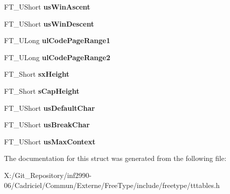 \begin{DoxyCompactItemize}
\item 
\hypertarget{struct_t_t___o_s2___aeb85b76e77753e4b59945550bdd098a1}{F\-T\-\_\-\-U\-Short {\bfseries us\-Win\-Ascent}}\label{struct_t_t___o_s2___aeb85b76e77753e4b59945550bdd098a1}

\item 
\hypertarget{struct_t_t___o_s2___a573ace3da03efa98a716a8443e4d0084}{F\-T\-\_\-\-U\-Short {\bfseries us\-Win\-Descent}}\label{struct_t_t___o_s2___a573ace3da03efa98a716a8443e4d0084}

\item 
\hypertarget{struct_t_t___o_s2___a0b5a2875c21d20e5a5b5f3641ddb29fc}{F\-T\-\_\-\-U\-Long {\bfseries ul\-Code\-Page\-Range1}}\label{struct_t_t___o_s2___a0b5a2875c21d20e5a5b5f3641ddb29fc}

\item 
\hypertarget{struct_t_t___o_s2___ad117c64d73d15d1304c75fb5f41f1124}{F\-T\-\_\-\-U\-Long {\bfseries ul\-Code\-Page\-Range2}}\label{struct_t_t___o_s2___ad117c64d73d15d1304c75fb5f41f1124}

\item 
\hypertarget{struct_t_t___o_s2___a2eb3bb1392461a536c393304bde72835}{F\-T\-\_\-\-Short {\bfseries sx\-Height}}\label{struct_t_t___o_s2___a2eb3bb1392461a536c393304bde72835}

\item 
\hypertarget{struct_t_t___o_s2___ac755913b648d535d1207927e4a6f1ec0}{F\-T\-\_\-\-Short {\bfseries s\-Cap\-Height}}\label{struct_t_t___o_s2___ac755913b648d535d1207927e4a6f1ec0}

\item 
\hypertarget{struct_t_t___o_s2___af8639fefeb705a9287df996b224462ea}{F\-T\-\_\-\-U\-Short {\bfseries us\-Default\-Char}}\label{struct_t_t___o_s2___af8639fefeb705a9287df996b224462ea}

\item 
\hypertarget{struct_t_t___o_s2___a1d47030e246d2593ec3e4cdf66b17161}{F\-T\-\_\-\-U\-Short {\bfseries us\-Break\-Char}}\label{struct_t_t___o_s2___a1d47030e246d2593ec3e4cdf66b17161}

\item 
\hypertarget{struct_t_t___o_s2___a167313e407c77db2c4ca5a987f3a1482}{F\-T\-\_\-\-U\-Short {\bfseries us\-Max\-Context}}\label{struct_t_t___o_s2___a167313e407c77db2c4ca5a987f3a1482}

\end{DoxyCompactItemize}


The documentation for this struct was generated from the following file\-:\begin{DoxyCompactItemize}
\item 
X\-:/\-Git\-\_\-\-Repository/inf2990-\/06/\-Cadriciel/\-Commun/\-Externe/\-Free\-Type/include/freetype/tttables.\-h\end{DoxyCompactItemize}
